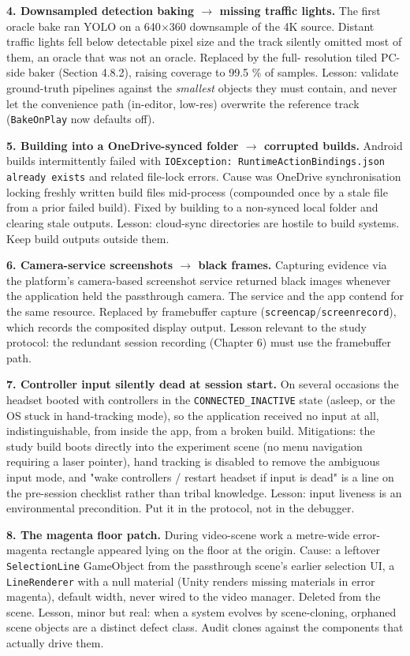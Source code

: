 \textbf{4. Downsampled detection baking $\rightarrow$ missing traffic lights.} The first oracle bake ran YOLO on a
640$\times$360 downsample of the 4K source. Distant traffic lights fell below detectable pixel size and the
track silently omitted most of them, an oracle that was not an oracle. Replaced by the full-
resolution tiled PC-side baker (Section 4.8.2), raising coverage to 99.5 \% of samples. Lesson:
validate ground-truth pipelines against the \textit{smallest} objects they must contain, and never let the
convenience path (in-editor, low-res) overwrite the reference track (\verb|BakeOnPlay| now defaults off).

\textbf{5. Building into a OneDrive-synced folder $\rightarrow$ corrupted builds.} Android builds intermittently
failed with \verb|IOException: RuntimeActionBindings.json already exists| and related file-lock errors.
Cause was OneDrive synchronisation locking freshly written build files mid-process (compounded once
by a stale file from a prior failed build). Fixed by building to a non-synced local folder and
clearing stale outputs. Lesson: cloud-sync directories are hostile to build systems. Keep build
outputs outside them.

\textbf{6. Camera-service screenshots $\rightarrow$ black frames.} Capturing evidence via the platform's camera-based
screenshot service returned black images whenever the application held the passthrough camera. The
service and the app contend for the same resource. Replaced by framebuffer capture
(\verb|screencap|/\verb|screenrecord|), which records the composited display output. Lesson relevant to the
study protocol: the redundant session recording (Chapter 6) must use the framebuffer path.

\textbf{7. Controller input silently dead at session start.} On several occasions the headset booted with
controllers in the \verb|CONNECTED_INACTIVE| state (asleep, or the OS stuck in hand-tracking mode), so the
application received no input at all, indistinguishable, from inside the app, from a broken build.
Mitigations: the study build boots directly into the experiment scene (no menu navigation requiring a
laser pointer), hand tracking is disabled to remove the ambiguous input mode, and "wake controllers /
restart headset if input is dead" is a line on the pre-session checklist rather than tribal
knowledge. Lesson: input liveness is an environmental precondition. Put it in the protocol, not in
the debugger.

\textbf{8. The magenta floor patch.} During video-scene work a metre-wide error-magenta rectangle
appeared lying on the floor at the origin. Cause: a leftover \verb|SelectionLine| GameObject from the
passthrough scene's earlier selection UI, a \verb|LineRenderer| with a null material (Unity renders
missing materials in error magenta), default width, never wired to the video manager. Deleted from
the scene. Lesson, minor but real: when a system evolves by scene-cloning, orphaned scene objects are
a distinct defect class. Audit clones against the components that actually drive them.

